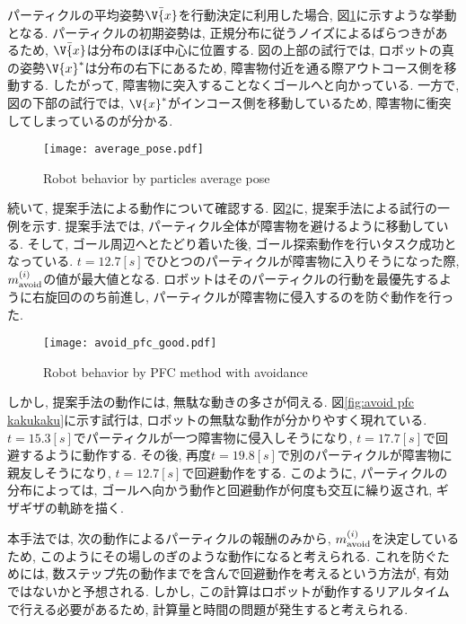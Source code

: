 パーティクルの平均姿勢$\bar{\V{x}}$を行動決定に利用した場合, 図\ref{fig:average pose}に示すような挙動となる. 
パーティクルの初期姿勢は, 正規分布に従うノイズによるばらつきがあるため, $\bar{\V{x}}$は分布のほぼ中心に位置する. 
図の上部の試行では, ロボットの真の姿勢$\V{x}^{*}$は分布の右下にあるため, 障害物付近を通る際アウトコース側を移動する. 
したがって, 障害物に突入することなくゴールへと向かっている. 
一方で, 図の下部の試行では, $\V{x}^{*}$がインコース側を移動しているため, 障害物に衝突してしまっているのが分かる. 

\begin{figure}[h]
  \begin{center}
    \texttt{[image: average\_pose.pdf]}
    \caption{Robot behavior by particles average pose}
    \label{fig:average pose}
  \end{center}
\end{figure}

続いて, 提案手法による動作について確認する. 
図\ref{fig:avoid pfc good}に, 提案手法による試行の一例を示す. 
提案手法では, パーティクル全体が障害物を避けるように移動している. 
そして, ゴール周辺へとたどり着いた後, ゴール探索動作を行いタスク成功となっている. 
$t=12.7[\si{s}]$でひとつのパーティクルが障害物に入りそうになった際, $m^{(i)}_{\rm avoid}$の値が最大値となる. 
ロボットはそのパーティクルの行動を最優先するように右旋回ののち前進し, パーティクルが障害物に侵入するのを防ぐ動作を行った. 

\begin{figure}[h]
  \begin{center}
    \texttt{[image: avoid\_pfc\_good.pdf]}
    \caption{Robot behavior by PFC method with avoidance}
    \label{fig:avoid pfc good}
  \end{center}
\end{figure}

しかし, 提案手法の動作には, 無駄な動きの多さが伺える. 
図\ref{fig:avoid pfc kakukaku}に示す試行は, ロボットの無駄な動作が分かりやすく現れている. 
$t=15.3[\si{s}]$でパーティクルが一つ障害物に侵入しそうになり, $t=17.7[\si{s}]$で回避するように動作する. 
その後, 再度$t=19.8[\si{s}]$で別のパーティクルが障害物に親友しそうになり, $t=12.7[\si{s}]$で回避動作をする. 
このように, パーティクルの分布によっては, ゴールへ向かう動作と回避動作が何度も交互に繰り返され, ギザギザの軌跡を描く. 

本手法では, 次の動作によるパーティクルの報酬のみから, $m^{(i)}_{\rm avoid}$を決定しているため, 
このようにその場しのぎのような動作になると考えられる. 
これを防ぐためには, 数ステップ先の動作までを含んで回避動作を考えるという方法が, 有効ではないかと予想される. 
しかし, この計算はロボットが動作するリアルタイムで行える必要があるため, 計算量と時間の問題が発生すると考えられる. 

